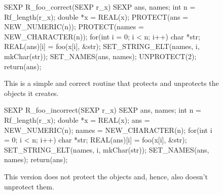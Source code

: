 \noindent
\begin{figure}[ht]
\begin{minipage}[t]{0.45\linewidth}
\centering
\begin{CCode}
SEXP
R_foo_correct(SEXP r_x)
{
  SEXP ans, names;
  int n = Rf_length(r_x);
  double *x = REAL(x);
  PROTECT(ans = NEW_NUMERIC(n));
  PROTECT(names = NEW_CHARACTER(n));
  for(int i = 0; i < n; i++) {
    char *str;
    REAL(ans)[i] = foo(x[i], &str);
    SET_STRING_ELT(names, i, 
                     mkChar(str));
  }
  SET_NAMES(ans, names);
  UNPROTECT(2);
  return(ans);
}
\end{CCode}
\caption{This is a simple and correct \C{} routine
that protects and unprotects the \R{} objects it creates.}
\label{fig:ProtectCorrect}
\end{minipage}
\hspace{0.5cm}
\begin{minipage}[t]{0.45\linewidth}
\centering
\begin{CCode}
SEXP
R_foo_incorrect(SEXP r_x)
{
  SEXP ans, names;
  int n = Rf_length(r_x);
  double *x = REAL(x);
  ans = NEW_NUMERIC(n);
  names = NEW_CHARACTER(n);
  for(int i = 0; i < n; i++) {
    char *str;
    REAL(ans)[i] = foo(x[i], &str);
    SET_STRING_ELT(names, i, 
                       mkChar(str));
  }
  SET_NAMES(ans, names);
  return(ans);
}

\end{CCode}
\caption{This version does not protect the \R{} objects and, hence,
  also  doesn't unprotect them.}
\label{fig:ProtectIncorrect}
\end{minipage}
\end{figure}
